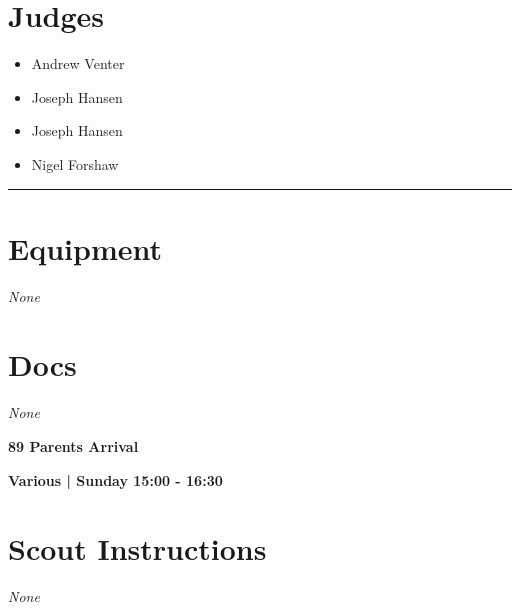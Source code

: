 \documentclass[10pt]{article}
\newcommand{\newtitle}[1]{\begin{center}{\Huge\bfseries #1 }\\ \vspace{5mm}\end{center}}
\newcommand{\newsubtitle}[1]{\begin{center}{\color{grey}\Large\bfseries #1 }\\ \vspace{5mm}\end{center}}
\begin{document}
		\section*{\faUsers \: Judges}

		

	\begin{multicols}{2}

		\begin{itemize}
									\item Andrew Venter
									\item Joseph Hansen
						\end{itemize}

		\vfill\null
		\columnbreak

		\begin{itemize}
									\item Joseph Hansen
									\item Nigel Forshaw
						\end{itemize}

		\vfill\null

		\end{multicols}



			\vspace{0.5cm}
	\hrule
	\vspace{0.5cm}

	\begin{multicols}{2}

		\section*{\faWrench \: Equipment}

				\textit{None}
		
		\vfill\null
		\columnbreak

			\section*{\faFile \: Docs}
		 	\textit{None}
	

		\vfill\null

		\end{multicols}



	\vspace{1cm}


	\clearpage
		\newtitle{89 Parents Arrival }
	\newsubtitle{Various | Sunday 15:00 - 16:30}
		\setcounter{section}{88}
	\section*{Scout Instructions}
		\textit{None}
	
\end{document}
